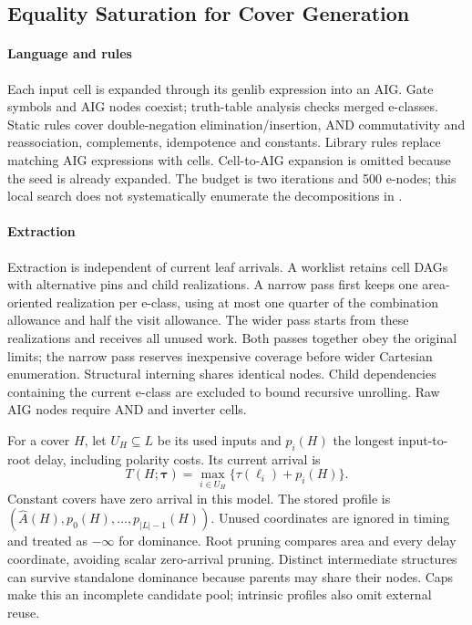 \subsection{Equality Saturation for Cover Generation}\label{sec:egg}
\paragraph{Language and rules}
Each input cell is expanded through its genlib expression into an AIG. Gate symbols and AIG nodes coexist; truth-table analysis checks merged e-classes. Static rules cover double-negation elimination/insertion, AND commutativity and reassociation, complements, idempotence and constants. Library rules replace matching AIG expressions with cells. Cell-to-AIG expansion is omitted because the seed is already expanded. The budget is two iterations and 500 e-nodes; this local search does not systematically enumerate the decompositions in .

\paragraph{Extraction}
Extraction is independent of current leaf arrivals. A worklist retains cell DAGs with alternative pins and child realizations. A narrow pass first keeps one area-oriented realization per e-class, using at most one quarter of the combination allowance and half the visit allowance. The wider pass starts from these realizations and receives all unused work. Both passes together obey the original limits; the narrow pass reserves inexpensive coverage before wider Cartesian enumeration. Structural interning shares identical nodes. Child dependencies containing the current e-class are excluded to bound recursive unrolling. Raw AIG nodes require AND and inverter cells.

For a cover $H$, let $U_H\subseteq L$ be its used inputs and $p_i(H)$ the longest input-to-root delay, including polarity costs. Its current arrival is
\begin{equation}\label{eq:profile}
T(H;\boldsymbol{\tau})=\max_{i\in U_H}\{\tau(\ell_i)+p_i(H)\}.
\end{equation}
Constant covers have zero arrival in this model. The stored profile is $(\widehat A(H),p_0(H),\ldots,p_{|L|-1}(H))$. Unused coordinates are ignored in timing and treated as $-\infty$ for dominance. Root pruning compares area and every delay coordinate, avoiding scalar zero-arrival pruning. Distinct intermediate structures can survive standalone dominance because parents may share their nodes. Caps make this an incomplete candidate pool; intrinsic profiles also omit external reuse.

